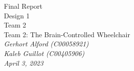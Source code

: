\documentclass[conference]{IEEEtran}
\begin{document}
\begin{titlepage}
    \begin{center}
        \vspace*{7cm}
        {\fontsize{16}{20}\selectfont Final Report} \\ 
        \vspace{.3cm}
        {\fontsize{16}{20}\selectfont Design 1} \\
        \vspace{.3cm}
        {\fontsize{16}{20}\selectfont Team 2}\\
        \vspace{.3cm}
        {\fontsize{16}{20}\selectfont Team 2: The Brain-Controlled Wheelchair} \\
        \vspace{.6cm}
        \textit{\fontsize{16}{20}\selectfont Gerhort Alford (C00058921)} \\
        \vspace{.3cm}
        \textit{\fontsize{16}{20}\selectfont Kaleb Guillot (C00405906)} \\
        \vspace{.3cm}
        \textit{\fontsize{16}{20}\selectfont April 3, 2023\\}
        \vfill
    \end{center}
\end{titlepage}
\thispagestyle{empty}
\pagestyle{empty}
\onecolumn
\tableofcontents
\twocolumn

\onecolumn
\clearpage
\thispagestyle{plain}
\pagestyle{plain}
\end{document}
